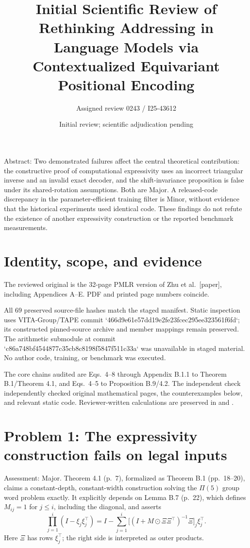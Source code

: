 \documentclass[10pt]{article}
\title{Initial Scientific Review of
Rethinking Addressing in Language Models via Contextualized Equivariant Positional Encoding}
\author{Assigned review 0243 / I25-43612}
\date{Initial review; scientific adjudication pending}
\begin{document}
\maketitle
Abstract: Two demonstrated failures affect the central theoretical contribution: the constructive proof of computational expressivity uses an incorrect triangular inverse and an invalid exact decoder, and the shift-invariance proposition is false under its shared-rotation assumptions. Both are Major. A released-code discrepancy in the parameter-efficient training filter is Minor, without evidence that the historical experiments used identical code. These findings do not refute the existence of another expressivity construction or the reported benchmark measurements.\par
\section*{Identity, scope, and evidence}
The reviewed original is the 32-page PMLR version of Zhu et al. [paper], including Appendices A–E. PDF and printed page numbers coincide.\par
All 69 preserved source-file hashes match the staged manifest. Static inspection uses VITA-Group/TAPE commit `466d9e61e57dd19e2fe23fcec295ee323561f6fd`; its constructed pinned-source archive and member mappings remain preserved. The arithmetic submodule at commit `c86a748bf4544877c35cb8c8198f5847f511c33a` was unavailable in staged material. No author code, training, or benchmark was executed.\par
The core chains audited are Eqs. 4–8 through Appendix B.1.1 to Theorem B.1/Theorem 4.1, and Eqs. 4–5 to Proposition B.9/4.2. The independent check independently checked original mathematical pages, the counterexamples below, and relevant static code. Reviewer-written calculations are preserved in and .\par
\section*{Problem 1: The expressivity construction fails on legal inputs}
Assessment: Major. Theorem 4.1 (p. 7), formalized as Theorem B.1 (pp. 18–20), claims a constant-depth, constant-width construction solving the \(\Pi(5)\) group word problem exactly. It explicitly depends on Lemma B.7 (p. 22), which defines \(M_{ij}=1\) for \(j\leq i\), including the diagonal, and asserts \[\prod_{j=1}^{i}(I-\xi_j\xi_j^\top)
 =I-\sum_{j=1}^{i}\big[(I+M\odot\Xi\Xi^\top)^{-1}\Xi\big]_j\xi_j^\top.\] Here \(\Xi\) has rows \(\xi_j^\top\); the right side is interpreted as outer products.\par
\end{document}
